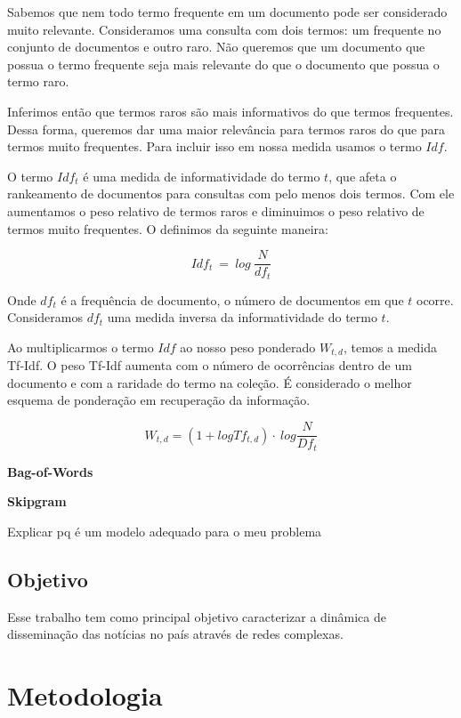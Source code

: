 \documentclass[a4paper,12pt]{article}
\begin{document}
\begin{description}
Sabemos que nem todo termo frequente em um documento pode ser considerado muito relevante. Consideramos uma consulta com dois termos:
um frequente no conjunto de documentos e outro raro. Não queremos que um documento que possua o termo frequente seja mais relevante do que o
documento que possua o termo raro.

Inferimos então que termos raros são mais informativos do que termos frequentes. Dessa forma, queremos dar uma maior relevância para
termos raros do que para termos muito frequentes. Para incluir isso em nossa medida usamos o termo $Idf$.

O termo $Idf_{t}$ é uma medida de informatividade do termo $t$, que afeta o rankeamento de documentos para consultas com pelo menos dois
termos. Com ele aumentamos o peso relativo de termos raros e diminuimos o peso relativo
de termos muito frequentes. O definimos da seguinte maneira:

$$ Idf_{t}\ = \ log\ \frac{N}{df_{t}}$$

Onde $df_{t}$ é a frequência de documento, o número de documentos em que $t$ ocorre. Consideramos $df_{t}$ uma medida inversa da informatividade
do termo $t$.

Ao multiplicarmos o termo $Idf$ ao nosso peso ponderado $W_{t,d}$, temos a medida Tf-Idf. O peso Tf-Idf aumenta com o número de ocorrências
dentro de um documento e com a raridade do termo na coleção. É considerado o melhor esquema de ponderação em recuperação da informação.

$$ W_{t,d} = (1 + log Tf_{t,d}) \cdot \ log \dfrac{N}{Df_{t}}$$

\item \textbf{Bag-of-Words}
\item \textbf{Skipgram}

Explicar pq é um modelo adequado para o meu problema
\end{description}

\subsection{Objetivo}

Esse trabalho tem como principal objetivo caracterizar a dinâmica de disseminação das notícias no país através de redes complexas.




\pagebreak
\section{Metodologia}
\end{document}
